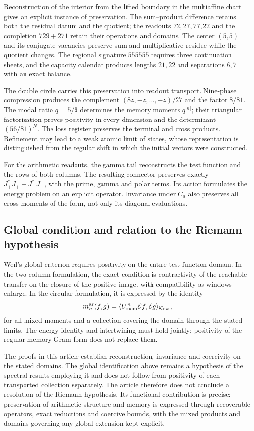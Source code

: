 Reconstruction of the interior from the lifted boundary
in the multiaffine chart gives an explicit instance of
preservation. The sum--product difference retains both
the residual datum and the quotient; the readouts
$72,27,77,22$ and the completion $729+271$ retain their
operations and domains. The center $(5,5)$ and its
conjugate vacancies preserve sum and multiplicative
residue while the quotient changes. The regional
signature $555555$ requires three continuation sheets,
and the capacity calendar produces lengths $21,22$
and separations $6,7$ with an exact balance.

The double circle carries this preservation into
readout transport. Nine-phase compression produces
the complement $(8z,-z,\ldots,-z)/27$ and the factor
$8/81$. The modal ratio $q=5/9$ determines the memory
moments $q^{|n|}$; their triangular factorization proves
positivity in every dimension and the determinant
$(56/81)^N$. The loss register preserves the terminal
and cross products. Refinement may lead to a weak
atomic limit of states, whose representation is
distinguished from the regular shift in which the
initial vectors were constructed.

For the arithmetic readouts, the gamma tail
reconstructs the test function and the rows of both
columns. The resulting connector preserves exactly
$J_+^*J_+-J_-^*J_-$, with the prime, gamma and polar
terms. Its action formulates the energy problem on
an explicit operator. Invariance under $C_a$ also
preserves all cross moments of the form, not only
its diagonal evaluations.

\subsection*{Global condition and relation to the Riemann hypothesis}

Weil's global criterion requires positivity on the
entire test-function domain. In the two-column
formulation, the exact condition is contractivity of
the reachable transfer on the closure of the positive
image, with compatibility as windows enlarge. In the
circular formulation, it is expressed by the identity
\[
m_n^{\rm ar}(f,g)
=\langle U_{\rm mem}^{\,n}\mathcal E f,
          \mathcal E g\rangle_{\mathcal K_{\rm lim}},
\]
for all mixed moments and a collection covering the
domain through the stated limits. The energy identity
and intertwining must hold jointly; positivity of
the regular memory Gram form does not replace them.

The proofs in this article establish reconstruction,
invariance and coercivity on the stated domains.
The global identification above remains a hypothesis
of the spectral results employing it and does not
follow from positivity of each transported collection
separately. The article therefore does not conclude
a resolution of the Riemann hypothesis. Its functional
contribution is precise: preservation of arithmetic
structure and memory is expressed through recoverable
operators, exact reductions and coercive bounds,
with the mixed products and domains governing any
global extension kept explicit.
